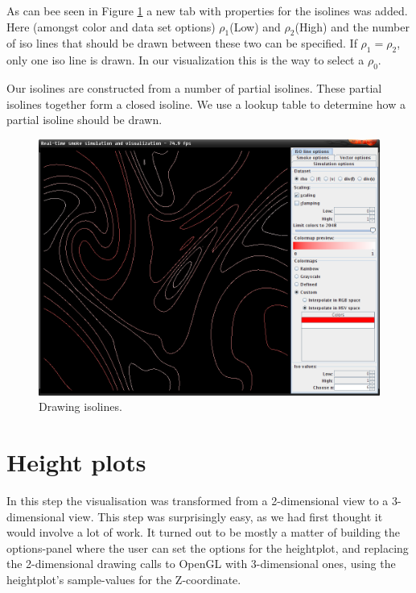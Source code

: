 \documentclass[a4paper,11pt,twoside]{report}
\begin{document}
        As can bee seen in Figure \ref{fig:step5} a new tab with properties for the isolines was added. Here (amongst color and data set options) $\rho_1$(Low) and $\rho_2$(High) and the number of iso lines that should be drawn between these two can be specified. If $\rho_1 = \rho_2$, only one iso line is drawn. In our visualization this is the way to select a $\rho_0$.
        
        Our isolines are constructed from a number of partial isolines. These partial isolines together form a closed isoline. We use a lookup table to determine how a partial isoline should be drawn.
		\begin{figure}[h]
		\centering
		\includegraphics[scale=\imagescalefactor]{images/step5.png}
		\caption{Drawing isolines.}\label{fig:step5}
		\end{figure}
		\clearpage
	\section{Height plots}
		In this step the visualisation was transformed from a 2-dimensional view to a 3-dimensional view. This step was surprisingly easy, as we had first thought it would involve a lot of work. It turned out to be mostly a matter of building the options-panel where the user can set the options for the heightplot, and replacing the 2-dimensional drawing calls to OpenGL with 3-dimensional ones, using the heightplot's sample-values for the Z-coordinate.
\end{document}
